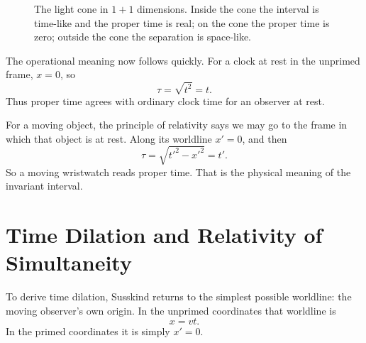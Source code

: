\begin{figure}[h]
\centering
{}
\caption{The light cone in \(1+1\) dimensions. Inside the cone the interval is time-like and the proper time is real; on the cone the proper time is zero; outside the cone the separation is space-like.}
\end{figure}

The operational meaning now follows quickly. For a clock at rest in the unprimed frame, \(x=0\), so
\begin{equation}
\tau=\sqrt{t^2}=t.
\end{equation}
Thus proper time agrees with ordinary clock time for an observer at rest.

For a moving object, the principle of relativity says we may go to the frame in which that object is at rest. Along its worldline \(x'=0\), and then
\begin{equation}
\tau=\sqrt{t'^2-x'^2}=t'.
\end{equation}
So a moving wristwatch reads proper time. That is the physical meaning of the invariant interval.

\section{Time Dilation and Relativity of Simultaneity}

To derive time dilation, Susskind returns to the simplest possible worldline: the moving observer's own origin. In the unprimed coordinates that worldline is
\begin{equation}
x=vt.
\end{equation}
In the primed coordinates it is simply \(x'=0\).

